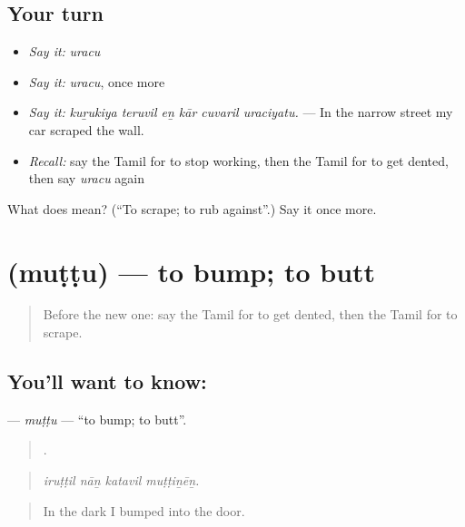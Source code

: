\subsection*{Your turn}
\begin{itemize}
\raggedright
  \item \emph{Say it:} \emph{uracu}
  \item \emph{Say it:} \emph{uracu}, once more
  \item \emph{Say it:} \emph{kuṟukiya teruvil eṉ kār cuvaril uraciyatu.} — In the narrow street my car scraped the wall.
  \item \emph{Recall:} say the Tamil for to stop working, then the Tamil for to get dented, then say \emph{uracu} again
\end{itemize}

\begin{tcolorbox}[breakable,colback=teal!4,colframe=teal!35!black,title={Before you move on}]
What does  mean? (\textquotedblleft{}To scrape; to rub against\textquotedblright{}.) Say it once more.
\end{tcolorbox}
\section[\texorpdfstring{\ta{முட்டு} (muṭṭu)}{முட்டு (muṭṭu)}]{ (muṭṭu) — to bump; to butt}

\label{lesson:TA-C411-muttu}



\begin{quote}
Before the new one: say the Tamil for to get dented, then the Tamil for to scrape.
\end{quote}

\subsection*{You'll want to know: }
\textbf{} — \emph{muṭṭu} — \textquotedblleft{}to bump; to butt\textquotedblright{}.

\begin{quote}
   .
\end{quote}

\begin{quote}
\emph{iruṭṭil nāṉ katavil muṭṭiṉēṉ.}
\end{quote}

\begin{quote}
In the dark I bumped into the door.
\end{quote}

